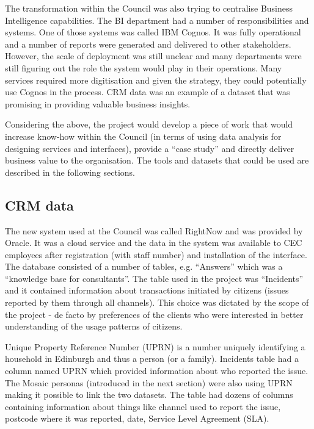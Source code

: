 The transformation within the Council was also trying to centralise Business Intelligence capabilities. The BI department had a number of responsibilities and systems. One of those systems was called IBM Cognos. It was fully operational and a number of reports were generated and delivered to other stakeholders. However, the scale of deployment was still unclear and many departments were still figuring out the role the system would play in their operations. Many services required more digitisation and given the strategy, they could potentially use Cognos in the process. CRM data was an example of a dataset that was promising in providing valuable business insights.

Considering the above, the project would develop a piece of work that would increase know-how within the Council (in terms of using data analysis for designing services and interfaces), provide a “case study” and directly deliver business value to the organisation. The tools and datasets that could be used are described in the following sections.

		\subsection{CRM data}
		
The new system used at the Council was called RightNow and was provided by Oracle. It was a cloud service and the data in the system was available to CEC employees after registration (with staff number) and installation of the interface. The database consisted of a number of tables, e.g. “Answers” which was a “knowledge base for consultants”. The table used in the project was “Incidents” and it contained information about transactions initiated by citizens (issues reported by them through all channels). This choice was dictated by the scope of the project - de facto by preferences of the clients who were interested in better understanding of the usage patterns of citizens.

Unique Property Reference Number (UPRN) is a number uniquely identifying a household in Edinburgh and thus a person (or a family). Incidents table had a column named UPRN which provided information about who reported the issue. The Mosaic personas (introduced in the next section) were also using UPRN making it possible to link the two datasets. The table had dozens of columns containing information about things like channel used to report the issue, postcode where it was reported, date, Service Level Agreement (SLA).

